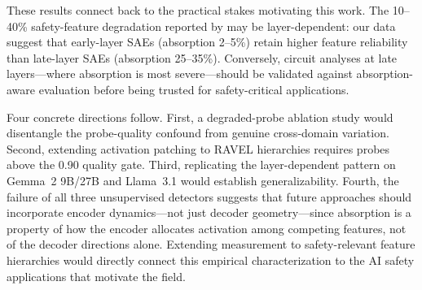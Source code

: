 \documentclass{article}
\begin{document}
These results connect back to the practical stakes motivating this work. The 10--40\% safety-feature degradation reported by \citet{lieberum2024gemma} may be layer-dependent: our data suggest that early-layer SAEs (absorption 2--5\%) retain higher feature reliability than late-layer SAEs (absorption 25--35\%). Conversely, circuit analyses at late layers---where absorption is most severe---should be validated against absorption-aware evaluation before being trusted for safety-critical applications.

Four concrete directions follow. First, a degraded-probe ablation study would disentangle the probe-quality confound from genuine cross-domain variation. Second, extending activation patching to RAVEL hierarchies requires probes above the 0.90 quality gate. Third, replicating the layer-dependent pattern on Gemma~2 9B/27B and Llama~3.1 would establish generalizability. Fourth, the failure of all three unsupervised detectors suggests that future approaches should incorporate encoder dynamics---not just decoder geometry---since absorption is a property of how the encoder allocates activation among competing features, not of the decoder directions alone. Extending measurement to safety-relevant feature hierarchies would directly connect this empirical characterization to the AI safety applications that motivate the field.



\end{document}
